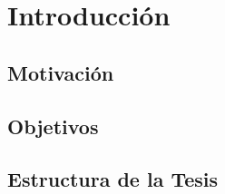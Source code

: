 \chapter{Introducción}\label{ch:introduction}

\section{Motivación}


\section{Objetivos}

\section{Estructura de la Tesis}
